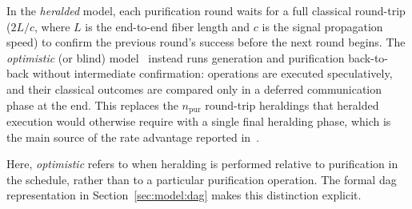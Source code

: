 In the \emph{heralded} model, each purification round waits for a full classical round-trip ($2L/c$, where $L$ is the end-to-end fiber length and $c$ is the signal propagation speed) to confirm the previous round's success before the next round begins. The \emph{optimistic} (or blind) model~\cite{Mobayenjarihani2023Optimistic,Benchasattabuse2025Integrating} instead runs generation and purification back-to-back without intermediate confirmation: operations are executed speculatively, and their classical outcomes are compared only in a deferred communication phase at the end. This replaces the $n_{\mathrm{pur}}$ round-trip heraldings that heralded execution would otherwise require with a single final heralding phase, which is the main source of the rate advantage reported in~\cite{Benchasattabuse2025Integrating}.

Here, \emph{optimistic} refers to when heralding is performed relative to purification in the schedule, rather than to a particular purification operation. The formal \Gls{dag} representation in Section~\ref{sec:model:dag} makes this distinction explicit.